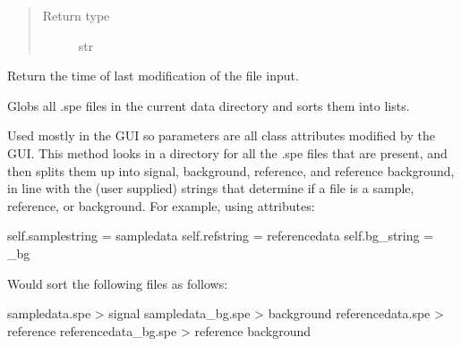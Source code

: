 \documentclass[a4paper,10pt,english]{sphinxmanual}
\begin{document}
\begin{fulllineitems}
\begin{fulllineitems}
\begin{quote}
\begin{description}
\item[{Return type}] \leavevmode
\sphinxAtStartPar
str

\end{description}\end{quote}

\end{fulllineitems}


\begin{fulllineitems}
\label{\detokenize{sfgtools:sfgtools.SFGProcessTools.get_file_creationtime}}
\sphinxAtStartPar
Return the time of last modification of the file input.

\end{fulllineitems}


\begin{fulllineitems}
\label{\detokenize{sfgtools:sfgtools.SFGProcessTools.get_filenames_smart}}
\sphinxAtStartPar
Globs all .spe files in the current data directory and sorts them into lists.

\sphinxAtStartPar
Used mostly in the GUI so parameters are all class attributes modified by the GUI. This method
looks in a directory for all the .spe files that are present, and then splits them up into signal,
background, reference, and reference background, in line with the (user supplied) strings that
determine if a file is a sample, reference, or background. For example, using attributes:

\sphinxAtStartPar
self.samplestring = sampledata
self.refstring = referencedata
self.bg\_string = \_bg

\sphinxAtStartPar
Would sort the following files as follows:

\sphinxAtStartPar
sampledata.spe \sphinxhyphen{}\textgreater{} signal
sampledata\_bg.spe \sphinxhyphen{}\textgreater{} background
referencedata.spe \sphinxhyphen{}\textgreater{} reference
referencedata\_bg.spe \sphinxhyphen{}\textgreater{} reference background


\end{fulllineitems}
\end{fulllineitems}
\end{document}
